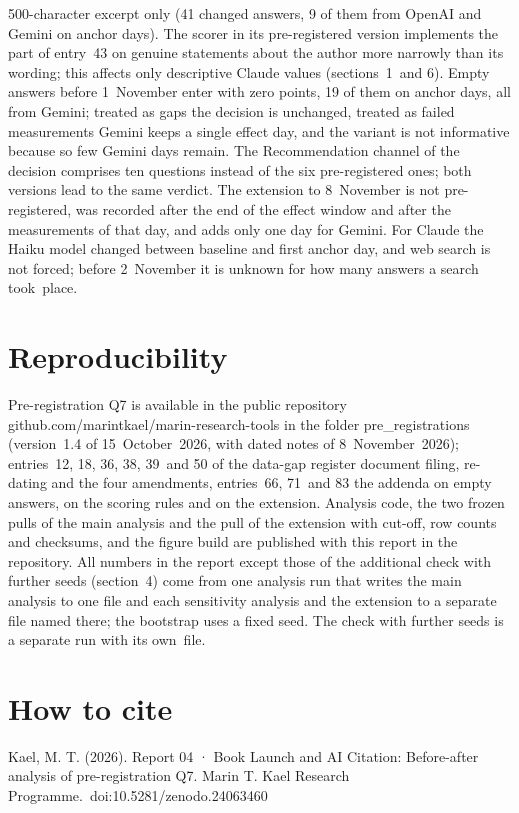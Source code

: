 \documentclass[11pt]{article}
\begin{document}
500-character excerpt only (41 changed answers, 9 of them from OpenAI and Gemini on anchor days). The scorer in its pre-registered version implements the part of entry~43 on genuine statements about the author more narrowly than its wording; this affects only descriptive Claude values (sections~1~and 6). Empty answers before 1~November enter with zero points, 19 of them on anchor days, all from Gemini; treated as gaps the decision is unchanged, treated as failed measurements Gemini keeps a single effect day, and the variant is not informative because so few Gemini days remain. The Recommendation channel of the decision comprises ten questions instead of the six pre-registered ones; both versions lead to the same verdict. The extension to 8~November is not pre-registered, was recorded after the end of the effect window and after the measurements of that day, and adds only one day for Gemini. For Claude the Haiku model changed between baseline and first anchor day, and web search is not forced; before 2~November it is unknown for how many answers a search took~\mbox{place.}

\let\FBsave\FloatBarrier\let\FloatBarrier\relax{}\section{Reproducibility}\let\FloatBarrier\FBsave{}

Pre-registration Q7 is available in the public repository github.com/\allowbreak{}marintkael/\allowbreak{}marin-\allowbreak{}research-\allowbreak{}tools in the folder pre\_registrations (version~1.4 of 15~October~2026, with dated notes of 8~November~2026); entries~12, 18, 36, 38, 39~and 50 of the data-gap register document filing, re-dating and the four amendments, entries~66, 71~and 83 the addenda on empty answers, on the scoring rules and on the extension. Analysis code, the two frozen pulls of the main analysis and the pull of the extension with cut-off, row counts and checksums, and the figure build are published with this report in the repository. All numbers in the report except those of the additional check with further seeds (section~4) come from one analysis run that writes the main analysis to one file and each sensitivity analysis and the extension to a separate file named there; the bootstrap uses a fixed seed. The check with further seeds is a separate run with its own~\mbox{file.}

\section{How to cite}
{\raggedright

Kael, M. T. (2026). Report 04 · Book Launch and AI Citation: Before-after analysis of pre-registration Q7. Marin T. Kael Research Programme.~\mbox{doi:10.5281/zenodo.24063460}
\par}
\end{document}
